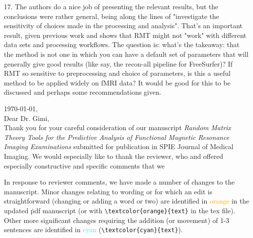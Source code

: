 \documentclass[10pt,letter]{article}
\begin{document}
{%





17. The authors do a nice job of presenting the relevant results, but the
conclusions were rather general, being along the lines of "investigate the
sensitivity of choices made in the processing and analysis". That's an
important result, given previous work and shows that RMT might not "work" with
different data sets and processing workflows. The question is: what's the
takeaway: that the method is not one in which you can have a default set of
parameters that will generally give good results (like say, the recon-all
pipeline for FreeSurfer)? If RMT so sensitive to preprocessing and choice of
parameters, is this a useful method to be applied widely on fMRI data? It would
be good for this to be discussed and perhaps some recommendations given.
}

\noindent
\today, \\
Dear Dr. Gimi, \\

Thank you for your careful consideration of our manuscript
\emph{Random Matrix Theory Tools for the Predictive Analysis of Functional
Magnetic Resonance Imaging Examinations} submitted for publication in SPIE
Journal of Medical Imaging. We would especially like to thank the reviewer,
who and offered especially constructive and specific comments that we

In response to reviewer comments, we have made a number of changes to the
manuscript. Minor changes relating to wording or for which an edit is
straightforward (changing or adding a word or two) are identified in
\textcolor{orange}{orange} in the updated \.pdf manuscript (or with
\verb|\textcolor{orange}{text}| in the \.tex file). Other more significant
changes requiring the addition (or movement) of 1-3 sentences are identified
in \textcolor{cyan}{cyan} (\verb|\textcolor{cyan}{text}|).
\end{document}
